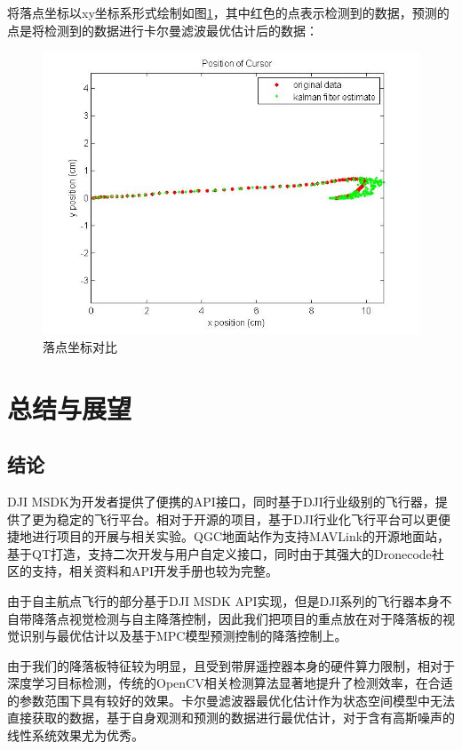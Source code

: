 将落点坐标以xy坐标系形式绘制如图\ref{Fig:img20}，其中红色的点表示检测到的数据，预测的点是将检测到的数据进行卡尔曼滤波最优估计后的数据：

\begin{figure}[ht]
  \centering
  \includegraphics[width=0.8\linewidth]{./Figure/Landingpad_Kalman_Prediction.jpg}
  \caption{落点坐标对比}\label{Fig:img20}
\end{figure}

\chapter{总结与展望}

\section{结论}

DJI MSDK为开发者提供了便携的API接口，同时基于DJI行业级别的飞行器，提供了更为稳定的飞行平台。相对于开源的项目，基于DJI行业化飞行平台可以更便捷地进行项目的开展与相关实验。QGC地面站作为支持MAVLink的开源地面站，基于QT打造，支持二次开发与用户自定义接口，同时由于其强大的Dronecode社区的支持，相关资料和API开发手册也较为完整。

由于自主航点飞行的部分基于DJI MSDK API实现，但是DJI系列的飞行器本身不自带降落点视觉检测与自主降落控制，因此我们把项目的重点放在对于降落板的视觉识别与最优估计以及基于MPC模型预测控制的降落控制上。

由于我们的降落板特征较为明显，且受到带屏遥控器本身的硬件算力限制，相对于深度学习目标检测，传统的OpenCV相关检测算法显著地提升了检测效率，在合适的参数范围下具有较好的效果。卡尔曼滤波器最优化估计作为状态空间模型中无法直接获取的数据，基于自身观测和预测的数据进行最优估计，对于含有高斯噪声的线性系统效果尤为优秀。

